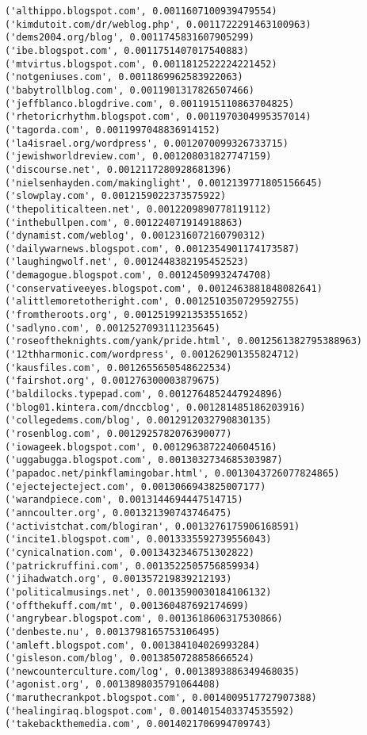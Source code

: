 \documentclass[11pt]{article}
\begin{document}
\begin{Verbatim}[commandchars=\\\{\}]
('althippo.blogspot.com', 0.0011607100939479554)
('kimdutoit.com/dr/weblog.php', 0.0011722291463100963)
('dems2004.org/blog', 0.0011745831607905299)
('ibe.blogspot.com', 0.0011751407017540883)
('mtvirtus.blogspot.com', 0.0011812522224221452)
('notgeniuses.com', 0.0011869962583922063)
('babytrollblog.com', 0.0011901317826507466)
('jeffblanco.blogdrive.com', 0.0011915110863704825)
('rhetoricrhythm.blogspot.com', 0.0011970304995357014)
('tagorda.com', 0.0011997048836914152)
('la4israel.org/wordpress', 0.0012070099326733715)
('jewishworldreview.com', 0.001208031827747159)
('discourse.net', 0.0012117280928681396)
('nielsenhayden.com/makinglight', 0.0012139771805156645)
('slowplay.com', 0.0012159022373575922)
('thepoliticalteen.net', 0.0012209890778119112)
('inthebullpen.com', 0.001224071914918863)
('dynamist.com/weblog', 0.0012316072160790312)
('dailywarnews.blogspot.com', 0.0012354901174173587)
('laughingwolf.net', 0.0012448382195452523)
('demagogue.blogspot.com', 0.00124509932474708)
('conservativeeyes.blogspot.com', 0.0012463881848082641)
('alittlemoretotheright.com', 0.0012510350729592755)
('fromtheroots.org', 0.0012519921353551652)
('sadlyno.com', 0.0012527093111235645)
('roseoftheknights.com/yank/pride.html', 0.0012561382795388963)
('12thharmonic.com/wordpress', 0.001262901355824712)
('kausfiles.com', 0.0012655650548622534)
('fairshot.org', 0.001276300003879675)
('baldilocks.typepad.com', 0.0012764852447924896)
('blog01.kintera.com/dnccblog', 0.001281485186203916)
('collegedems.com/blog', 0.0012912032790830135)
('rosenblog.com', 0.0012925782076390077)
('iowageek.blogspot.com', 0.0012963872240604516)
('uggabugga.blogspot.com', 0.0013032734685303987)
('papadoc.net/pinkflamingobar.html', 0.0013043726077824865)
('ejectejecteject.com', 0.0013066943825007177)
('warandpiece.com', 0.0013144694447514715)
('anncoulter.org', 0.001321390743746475)
('activistchat.com/blogiran', 0.0013276175906168591)
('incite1.blogspot.com', 0.0013335592739556043)
('cynicalnation.com', 0.0013432346751302822)
('patrickruffini.com', 0.0013522505756859934)
('jihadwatch.org', 0.001357219839212193)
('politicalmusings.net', 0.0013590030184106132)
('offthekuff.com/mt', 0.001360487692174699)
('angrybear.blogspot.com', 0.0013618606317530866)
('denbeste.nu', 0.0013798165753106495)
('amleft.blogspot.com', 0.001384104026993284)
('gisleson.com/blog', 0.0013850728858666524)
('newcounterculture.com/log', 0.0013893886349468035)
('agonist.org', 0.0013898035791064408)
('maruthecrankpot.blogspot.com', 0.0014009517727907388)
('healingiraq.blogspot.com', 0.0014015403374535592)
('takebackthemedia.com', 0.0014021706994709743)

\end{Verbatim}
\end{document}
